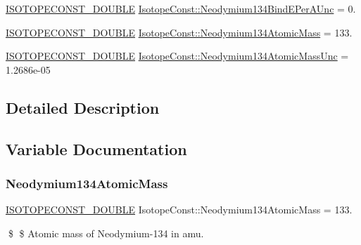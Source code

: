 \begin{DoxyCompactItemize}
\mbox{\hyperlink{group___isotope_const-_macros_ga8f45a7272ce02c0b4c65c44636ed719a}{I\+S\+O\+T\+O\+P\+E\+C\+O\+N\+S\+T\+\_\+\+D\+O\+U\+B\+LE}} \mbox{\hyperlink{group___isotope_const-_neodymium-_nd134_gadbe3595c2d70da0d1965c8843a21c58a}{Isotope\+Const\+::\+Neodymium134\+Bind\+E\+Per\+A\+Unc}} = 0.
\item 
\mbox{\hyperlink{group___isotope_const-_macros_ga8f45a7272ce02c0b4c65c44636ed719a}{I\+S\+O\+T\+O\+P\+E\+C\+O\+N\+S\+T\+\_\+\+D\+O\+U\+B\+LE}} \mbox{\hyperlink{group___isotope_const-_neodymium-_nd134_ga79368040da7edde5b58fed21855a6b6b}{Isotope\+Const\+::\+Neodymium134\+Atomic\+Mass}} = 133.
\item 
\mbox{\hyperlink{group___isotope_const-_macros_ga8f45a7272ce02c0b4c65c44636ed719a}{I\+S\+O\+T\+O\+P\+E\+C\+O\+N\+S\+T\+\_\+\+D\+O\+U\+B\+LE}} \mbox{\hyperlink{group___isotope_const-_neodymium-_nd134_ga0c0319577298b0b35dddcc2b4eaa6ac9}{Isotope\+Const\+::\+Neodymium134\+Atomic\+Mass\+Unc}} = 1.\+2686e-\/05
\end{DoxyCompactItemize}


\subsection{Detailed Description}


\subsection{Variable Documentation}
\mbox{\label{group___isotope_const-_neodymium-_nd134_ga79368040da7edde5b58fed21855a6b6b}} 
\subsubsection{\texorpdfstring{Neodymium134\+Atomic\+Mass}{Neodymium134AtomicMass}}
{\footnotesize\ttfamily \mbox{\hyperlink{group___isotope_const-_macros_ga8f45a7272ce02c0b4c65c44636ed719a}{I\+S\+O\+T\+O\+P\+E\+C\+O\+N\+S\+T\+\_\+\+D\+O\+U\+B\+LE}} Isotope\+Const\+::\+Neodymium134\+Atomic\+Mass = 133.}

\$ \$ Atomic mass of Neodymium-\/134 in amu. \mbox{\label{group___isotope_const-_neodymium-_nd134_ga0c0319577298b0b35dddcc2b4eaa6ac9}} 
